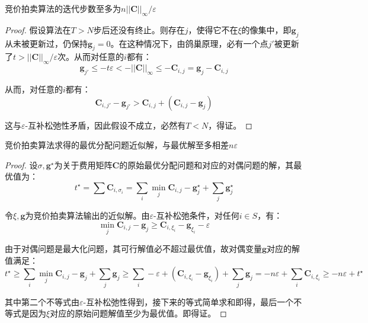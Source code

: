 \documentclass[cn,10pt,math=newtx,citestyle=gb7714-2015,bibstyle=gb7714-2015]{elegantbook}
\begin{document}
\begin{proposition}[收敛速度]
竞价拍卖算法的迭代步数至多为$n||\mathbf{C}||_\infty/\varepsilon$
\end{proposition}

\begin{proof}
假设算法在$T>N$步后还没有终止。则存在$j$，使得它不在$\xi$的像集中，即$\mathbf{g}_j$从未被更新过，仍保持$\mathbf{g}_j=0$。在这种情况下，由鸽巢原理，必有一个点$j'$被更新了$t>||\mathbf{C}||_\infty/\varepsilon$次。从而对任意的$i$都有：
\begin{equation*}
    \mathbf{g}_{j'} \leq -t\varepsilon < -||\mathbf{C}||_\infty \leq -\mathbf{C}_{i,j} = \mathbf{g}_j - \mathbf{C}_{i,j}
\end{equation*}

从而，对任意的$i$都有：
\begin{equation*}
    \mathbf{C}_{i,j'}-\mathbf{g}_{j'} > \mathbf{C}_{i,j} + (\mathbf{C}_{i,j} - \mathbf{g}_j)
\end{equation*}

这与$\varepsilon$-互补松弛性矛盾，因此假设不成立，必然有$T<N$，得证。
\end{proof}

\begin{proposition}[计算误差]
竞价拍卖算法求得的最优分配问题近似解，与最优解至多相差$n\varepsilon$
\end{proposition}

\begin{proof}
设$\sigma,\mathbf{g}^\star$为关于费用矩阵$\mathbf{C}$的原始最优分配问题和对应的对偶问题的解，其最优值为：
\begin{equation*}
    t^\star = \sum \mathbf{C}_{i,\sigma_i} = \sum_i \min\limits_j \mathbf{C}_{i,j} - \mathbf{g}_j^\star + \sum_j \mathbf{g}_j^\star
\end{equation*}

令$\xi,\mathbf{g}$为竞价拍卖算法输出的近似解。由$\varepsilon$-互补松弛条件，对任何$i\in S$，有：
\begin{equation*}
    \min\limits_j \mathbf{C}_{i,j} - \mathbf{g}_j \geq \mathbf{C}_{i,\xi_i} - \mathbf{g}_{\xi_i} - \varepsilon
\end{equation*}

由于对偶问题是最大化问题，其可行解值必不超过最优值，故对偶变量$\mathbf{g}$对应的解值满足：
\begin{equation*}
    t^\star \geq \sum_i \min\limits_j \mathbf{C}_{i,j} - \mathbf{g}_j + \sum_j \mathbf{g}_j \geq \sum_i -\varepsilon + (\mathbf{C}_{i,\xi_i} - \mathbf{g}_{\xi_i}) + \sum_j \mathbf{g}_j = -n\varepsilon + \sum_i \mathbf{C}_{i,\xi_i} \geq -n\varepsilon + t^\star
\end{equation*}

其中第二个不等式由$\varepsilon$-互补松弛性得到，接下来的等式简单求和即得，最后一个不等式是因为$\xi$对应的原始问题解值至少为最优值。即得证。
\end{proof}
\end{document}
